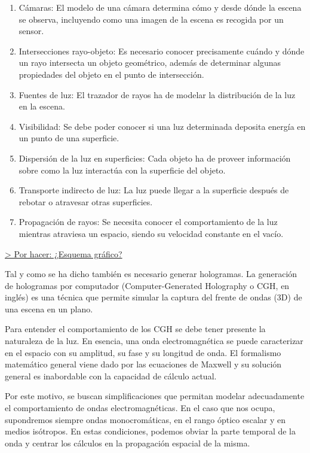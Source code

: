 \documentclass[10pt, a4paper]{article}
\begin{document}
\begin{enumerate}
    \item Cámaras: El modelo de una cámara determina cómo y desde dónde la escena se observa, incluyendo como una imagen de la escena es recogida por un sensor.
    
    \item Intersecciones rayo-objeto: Es necesario conocer precisamente cuándo y dónde un rayo intersecta un objeto geométrico, además de determinar algunas propiedades del objeto en el punto de intersección.
    
    \item Fuentes de luz: El trazador de rayos ha de modelar la distribución de la luz en la escena.
    
    \item Visibilidad: Se debe poder conocer si una luz determinada deposita energía en un punto de una superficie.
    
    \item Dispersión de la luz en superficies: Cada objeto ha de proveer información sobre como la luz interactúa con la superficie del objeto.
    
    \item Transporte indirecto de luz: La luz puede llegar a la superficie después de rebotar o atravesar otras superficies.
    
    \item Propagación de rayos: Se necesita conocer el comportamiento de la luz mientras atraviesa un espacio, siendo su velocidad constante en el vacío.
    
\end{enumerate}

\underline{> Por hacer: ¿Esquema gráfico?}

Tal y como se ha dicho también es necesario generar hologramas. La generación de hologramas por computador (Computer-Generated Holography o CGH, en inglés) es una técnica que permite simular la captura del frente de ondas (3D) de una escena en un plano. 

Para entender el comportamiento de los CGH se debe tener presente la naturaleza de la luz. En esencia, una onda electromagnética se puede caracterizar en el espacio con su amplitud, su fase y su longitud de onda. El formalismo matemático general viene dado por las ecuaciones de Maxwell \cite{Goodman:2017} y su solución general es inabordable con la capacidad de cálculo actual.

Por este motivo, se buscan simplificaciones que permitan modelar adecuadamente el comportamiento de ondas electromagnéticas. En el caso que nos ocupa, supondremos siempre ondas monocromáticas, en el rango óptico escalar y en medios isótropos. En estas condiciones, podemos obviar la parte temporal de la onda y centrar los cálculos en la propagación espacial de la misma.
\end{document}
